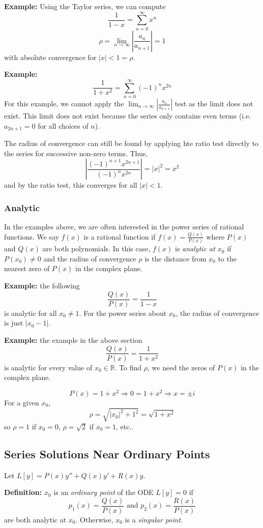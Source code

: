 \documentclass[11pt]{article}
\newcommand{\limseq}{\lim_{n \to \infty}} %
\newcommand{\example}{\textbf{Example: }}
\newcommand{\definition}{\textbf{Definition: }}
\newcommand{\sumseries}{\sum_{n=0}^{\infty}}
\begin{document}
	\example Using the Taylor series, we can compute
		$$ \frac{1}{1-x} = \sumseries x^n $$
		$$ \rho = \limseq \left| \frac{a_n}{a_{n+1}} \right| = 1 $$
	with absolute convergence for $|x| < 1 = \rho$.

	\example
		$$ \frac{1}{1+x^2} = \sumseries (-1)^n x^{2n} $$
	For this example, we cannot apply the $\limseq \left| \frac{a_n}{a_{n+1}} \right|$ test as the limit does not exist. This limit does not exist because the series only contains even terms (i.e. $a_{2n+1} = 0$ for all choices of $n$).

	The radius of convergence can still be found by applying hte ratio test directly to the series for successive non-zero terms. Thus,
		$$ \left| \frac{(-1)^{n+1} x^{2n+1}}{(-1)^n x^{2n}} \right| = |x|^2 = x^2 $$
	and by the ratio test, this converges for all $|x| < 1$.

\subsubsection{Analytic}
	In the examples above, we are often interested in the power series of rational functions. We say $f(x)$ is a rational function if $f(x) = \frac{Q(x)}{P(x)}$ where $P(x)$ and $Q(x)$ are both polynomials. In this case, $f(x)$ is \emph{analytic at $x_0$} if $P(x_0) \neq 0$ and the radius of convergence $\rho$ is the distance from $x_0$ to the nearest zero of $P(x)$ in the complex plane.

	\example the following
		$$ \frac{Q(x)}{P(x)} = \frac{1}{1-x} $$
	is analytic for all $x_0 \neq 1$. For the power series about $x_0$, the radius of convergence is just $|x_0 - 1|$.

	\example the example in the above section
		$$ \frac{Q(x)}{P(x)} = \frac{1}{1+x^2} $$
	is analytic for every value of $x_0 \in \mathbb{R}$. To find $\rho$, we need the zeros of $P(x)$ in the complex plane.

		$$ P(x) = 1 + x^2 \Rightarrow 0 = 1 + x^2 \Rightarrow x = \pm i $$
	For a given $x_0$,
		$$ \rho = \sqrt{|x_0|^2 + 1^2} = \sqrt{1 + x^2} $$
	so $\rho = 1$ if $x_0 = 0$, $\rho = \sqrt{2}$ if $x_0 = 1$, etc..

\subsection{Series Solutions Near Ordinary Points}
	Let $L[y] = P(x) y'' + Q(x) y' + R(x) y$.

	\definition $x_0$ is an \emph{ordinary point} of the ODE $L[y] = 0$ if
		$$ p_1 (x) = \frac{Q(x)}{P(x)} \text{ and } p_2 (x) = \frac{R(x)}{P(x)} $$
	are both analytic at $x_0$. Otherwise, $x_0$ is a \emph{singular point}.
\end{document}

